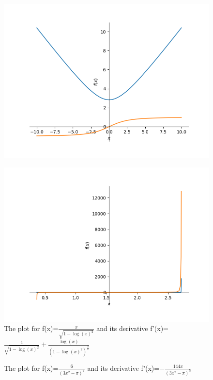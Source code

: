 \documentclass{article}
\begin{document}
\begin{figure}
\includegraphics{plot_14}
\end{figure}\begin{figure}
\caption{The plot for f(x)=$\frac{x}{\sqrt{1 - \log{\left(x \right)}^{2}}}$ and its derivative f'(x)=$\frac{1}{\sqrt{1 - \log{\left(x \right)}^{2}}} + \frac{\log{\left(x \right)}}{\left(1 - \log{\left(x \right)}^{2}\right)^{\frac{3}{2}}}$}
\centering
\includegraphics{plot_15}
\end{figure}\begin{figure}
\caption{The plot for f(x)=$\frac{6}{\left(3 x^{2} - \pi\right)^{4}}$ and its derivative f'(x)=$- \frac{144 x}{\left(3 x^{2} - \pi\right)^{5}}$}
\centering

\end{figure}
\end{document}

